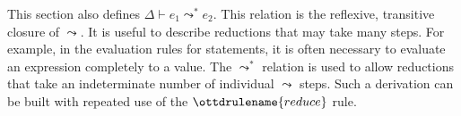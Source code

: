 \documentclass[11pt]{article}
\begin{document}
This section also defines $\Delta \vdash e_1 \leadsto^{*} e_2$.  This relation
is the reflexive, transitive closure of $\leadsto$.  It is useful to describe
reductions that may take many steps.  For example, in the evaluation rules for
statements, it is often necessary to evaluate an expression completely to a
value.  The $\leadsto^{*}$ relation is used to allow reductions that take an
indeterminate number of individual $\leadsto$ steps.  Such a derivation can be
built with repeated use of the $\ottdrulename{reduce}$ rule.

\medskip

\ottdefnsreduceXXexp

\ottdefnshelpers

\ottdefnsmultistepXXexp
\end{document}
